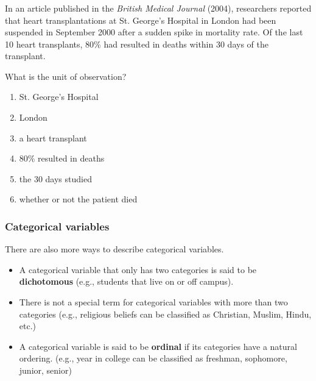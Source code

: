\begin{frame}
\frametitle{\grp}
In an article published in the \emph{British Medical Journal} (2004), researchers reported that heart transplantations at St. George’s Hospital in London had been suspended in September 2000 after a sudden spike in mortality rate. Of the last 10 heart transplants, 80\% had resulted in deaths within 30 days of the transplant.
\begin{clicker}{What is the unit of observation?}
\begin{enumerate}
    \item
    St. George's Hospital
    \item
    London
    \item
    a heart transplant
    \item
    80\% resulted in deaths
    \item
    the 30 days studied
    \item 
    whether or not the patient died
\end{enumerate}
\end{clicker}

\end{frame}

\begin{frame}
\frametitle{Categorical variables}
There are also more ways to describe categorical variables.
\begin{itemize}
    \item
    A categorical variable that only has two categories is said to be \textbf{dichotomous} (e.g., students that live on or off campus).
    \item
    There is not a special term for categorical variables with more than two categories (e.g., religious beliefs can be classified as Christian, Muslim, Hindu, etc.)
    \item
    A categorical variable is said to be \textbf{ordinal} if its categories have a natural ordering. (e.g., year in college can be classified as freshman, sophomore, junior, senior)
\end{itemize}
\end{frame}


